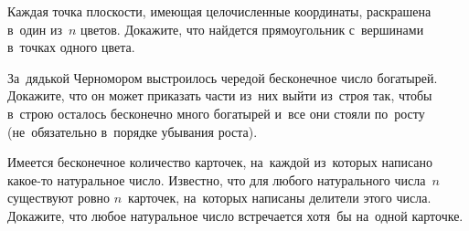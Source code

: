 


\begin{problems}

\item
Каждая точка плоскости, имеющая целочисленные координаты, раскрашена в~один
из~$n$ цветов.
Докажите, что найдется прямоугольник с~вершинами в~точках одного цвета.

\item
За~дядькой Черномором выстроилось чередой бесконечное число богатырей.
Докажите, что он может приказать части из~них выйти из~строя так, чтобы в~строю
осталось бесконечно много богатырей и~все они стояли по~росту (не~обязательно
в~порядке убывания роста).

\item
Имеется бесконечное количество карточек, на~каждой из~которых написано какое-то
натуральное число.
Известно, что для любого натурального числа~$n$ существуют ровно $n$~карточек,
на~которых написаны делители этого числа.
Докажите, что любое натуральное число встречается хотя~бы на~одной карточке.

\end{problems}

